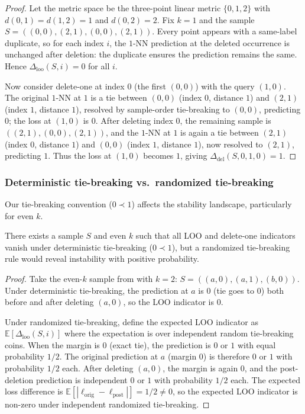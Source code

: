 \begin{proof}
Let the metric space be the three-point linear metric $\{0,1,2\}$ with
$d(0,1)=d(1,2)=1$ and $d(0,2)=2$. Fix $k=1$ and the sample
$S = ((0,0), (2,1), (0,0), (2,1))$. Every point appears with a same-label
duplicate, so for each index $i$, the $1$-NN prediction at the deleted
occurrence is unchanged after deletion: the duplicate ensures the prediction
remains the same. Hence $\Delta_{\mathrm{loo}}(S,i)=0$ for all $i$.

Now consider delete-one at index $0$ (the first $(0,0)$) with the query
$(1,0)$. The original $1$-NN at $1$ is a tie between $(0,0)$ (index $0$,
distance $1$) and $(2,1)$ (index $1$, distance $1$), resolved by sample-order
tie-breaking to $(0,0)$, predicting $0$; the loss at $(1,0)$ is $0$. After
deleting index $0$, the remaining sample is $((2,1), (0,0), (2,1))$, and the
$1$-NN at $1$ is again a tie between $(2,1)$ (index $0$, distance $1$) and
$(0,0)$ (index $1$, distance $1$), now resolved to $(2,1)$, predicting $1$.
Thus the loss at $(1,0)$ becomes $1$, giving
$\Delta_{\mathrm{del}}(S,0,1,0)=1$.
\end{proof}

\subsubsection{Deterministic tie-breaking vs.\ randomized tie-breaking}

Our tie-breaking convention ($0 \prec 1$) affects the stability landscape,
particularly for even $k$.

\begin{proposition}
\label{prop:tie-mask}
There exists a sample $S$ and even $k$ such that all LOO and delete-one
indicators vanish under deterministic tie-breaking ($0 \prec 1$), but a
randomized tie-breaking rule would reveal instability with positive
probability.
\end{proposition}

\begin{proof}
Take the even-$k$ sample from  with $k=2$:
$S = ((a,0), (a,1), (b,0))$. Under deterministic tie-breaking, the prediction
at $a$ is $0$ (tie goes to $0$) both before and after deleting $(a,0)$, so
the LOO indicator is $0$.

Under randomized tie-breaking, define the expected LOO indicator as
$\mathbb{E}[\Delta_{\mathrm{loo}}(S,i)]$ where the expectation is over
independent random tie-breaking coins. When the margin is $0$ (exact tie),
the prediction is $0$ or $1$ with equal probability $1/2$. The original
prediction at $a$ (margin $0$) is therefore $0$ or $1$ with probability
$1/2$ each. After deleting $(a,0)$, the margin is again $0$, and the
post-deletion prediction is independent $0$ or $1$ with probability $1/2$
each. The expected loss difference is
$\mathbb{E}[|\ell_{\text{orig}} - \ell_{\text{post}}|] = 1/2 \neq 0$, so the
expected LOO indicator is non-zero under independent randomized tie-breaking.
\end{proof}

